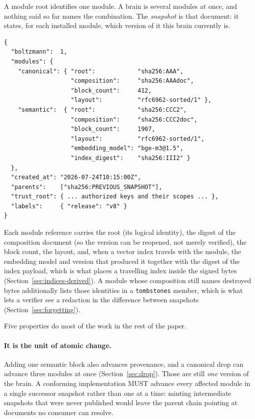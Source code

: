 \documentclass[11pt,a4paper]{article}
\begin{document}
A module root identifies one module. A brain is several modules at once, and
nothing said so far names the combination. The \emph{snapshot} is that document:
it states, for each installed module, which version of it this brain currently
is.

\begin{verbatim}
{
  "boltzmann":  1,
  "modules": {
    "canonical": { "root":            "sha256:AAA",
                   "composition":     "sha256:AAAdoc",
                   "block_count":     412,
                   "layout":          "rfc6962-sorted/1" },
    "semantic":  { "root":            "sha256:CCC2",
                   "composition":     "sha256:CCC2doc",
                   "block_count":     1907,
                   "layout":          "rfc6962-sorted/1",
                   "embedding_model": "bge-m3@1.5",
                   "index_digest":    "sha256:III2" }
  },
  "created_at": "2026-07-24T10:15:00Z",
  "parents":    ["sha256:PREVIOUS_SNAPSHOT"],
  "trust_root": { ... authorized keys and their scopes ... },
  "labels":     { "release": "v8" }
}
\end{verbatim}

Each module reference carries the root (its logical identity), the digest of
the composition document (so the version can be reopened, not merely
verified), the block count, the layout, and, when a vector index travels with
the module, the embedding model and version that produced it together with the
digest of the index payload, which is what places a travelling index inside
the signed bytes (Section~\ref{sec:indices-derived}). A module whose
composition still names destroyed bytes additionally lists those identities in
a \texttt{tombstones} member, which is what lets a verifier see a redaction in
the difference between snapshots (Section~\ref{sec:forgetting}).

Five properties do most of the work in the rest of the paper.

\paragraph{It is the unit of atomic change.}
Adding one semantic block also advances provenance, and a canonical drop can
advance three modules at once (Section~\ref{sec:drop}). Those are still
\emph{one} version of the brain. A conforming implementation MUST advance every
affected module in a single successor snapshot rather than one at a time:
minting intermediate snapshots that were never published would leave the parent
chain pointing at documents no consumer can resolve.
\end{document}
